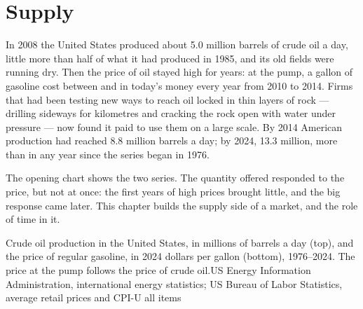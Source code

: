 \chapter{Supply}\label{ch:g10:supply}

In 2008 the United States produced about 5.0 million barrels of crude oil a day, little more than half of what it had
produced in 1985, and its old fields were running dry. Then the price
of oil stayed high for years: at the pump, a gallon of gasoline cost between  and  in today's
money every year from 2010 to 2014. Firms that had been testing new ways to reach oil locked in thin layers of rock
--- drilling sideways for kilometres and cracking the rock open with water under pressure --- now found it paid to
use them on a large scale. By 2014 American production had reached 8.8 million barrels a day; by 2024, 13.3 million,
more than in any year since the series began in 1976.

The opening chart shows the two series. The quantity offered responded to the price, but not at once: the first
years of high prices brought little, and the big response came later. This chapter builds the supply side of a
market, and the role of time in it.

\begin{openingchart}{Crude oil production in the United States, in millions of barrels a day (top), and the price of
regular gasoline, in 2024 dollars per gallon (bottom), 1976--2024. The price at the pump follows the price of crude oil.}{US Energy Information Administration, international energy statistics; US Bureau of Labor
Statistics, average retail prices and CPI-U all items}
\end{openingchart}

